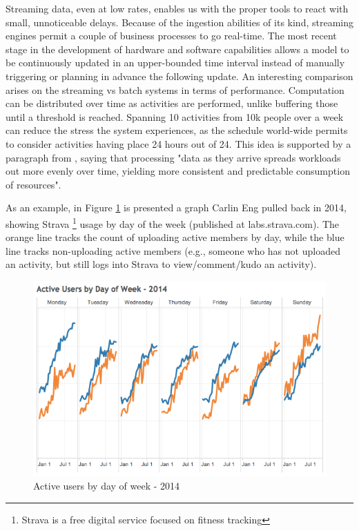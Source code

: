 Streaming data, even at low rates, enables us with the proper tools to react with small, unnoticeable delays. Because of the ingestion abilities of its kind, streaming engines permit a couple of business processes to go real-time. The most recent stage in the development of hardware and software capabilities allows a model to be continuously updated in an upper-bounded time interval instead of manually triggering or planning in advance the following update. An interesting comparison arises on the streaming vs batch systems in terms of performance. Computation can be distributed over time as activities are performed, unlike buffering those until a threshold is reached. Spanning 10 activities from 10k people over a week can reduce the stress the system experiences, as the schedule world-wide permits to consider activities having place 24 hours out of 24. This idea is supported by a paragraph from \cite{ACL}, saying that processing "data as they arrive spreads workloads out more evenly over time, yielding more consistent and predictable consumption of resources".

As an example, in Figure \ref{fig:strava} is presented a graph Carlin Eng pulled back in 2014, showing Strava \footnote{Strava is a free digital service focused on fitness tracking} usage by day of the week (published at labs.strava.com). The orange line tracks the count of uploading active members by day, while the blue line tracks non-uploading active members (e.g., someone who has not uploaded an activity, but still logs into Strava to view/comment/kudo an activity).

\begin{figure}[htp]
    \centering
    \includegraphics[width = 14cm]{figures/strava}
    \caption{Active users by day of week - 2014}
    \label{fig:strava}
\end{figure}

